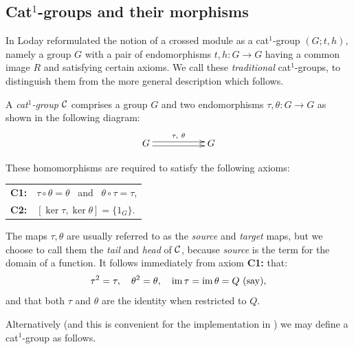 \subsection{Cat$^1$-groups and their morphisms} 
\label{subs:cat1}  

In \cite{loday1} Loday reformulated the notion of  
a crossed module as a cat$^1$-group $(G;t,h)$, 
namely a group $G$ with a pair of endomorphisms $t,h : G \to G$
having a common image $R$ and satisfying certain axioms. 
We call these \emph{traditional} cat$^1$-groups, to distinguish them 
from the more general description which follows. 

\begin{defn} \label{defn:cat1-group1}
A \emph{cat$^1$-group} $\mathcal{C}$ comprises a group $G$ and 
two endomorphisms $\tau,\theta : G \to G$ as shown in the following diagram:
$$
\xymatrix{
 G  \ar[rr] <0.5ex>^{\tau,\ \theta} \ar[rr] <-0.5ex>
   &&  G  \\
}
$$

\noindent
These homomorphisms are required to satisfy the following axioms:
\begin{center}
\begin{tabular}{r l}
\textbf{C1:} & $\tau \circ \theta = \theta$ ~and~ $\theta \circ \tau = \tau$, \\
\textbf{C2:} & $[\ker\tau, \ker\theta] = \{ 1_G \}$.
\end{tabular}
\end{center}
\end{defn} 

The maps  $\tau,\theta$  are usually referred to as the 
  
\emph{source} and \emph{target} maps, but we choose to call them the 
\emph{tail} and \emph{head} of  $\mathcal{C}$, 
because \emph{source} is the {\GAP} term for the domain of a function. 
It follows immediately from axiom {\bf C1:} that: 
$$
\tau^2 = \tau,\quad \theta^2 = \theta,\quad 
\mathrm{im}\,\tau = \mathrm{im}\,\theta = Q ~(\mbox{say}),
$$
and that both $\tau$ and $\theta$ are the identity when restricted to $Q$. 

\medskip
Alternatively (and this is convenient for the implementation in \XMod) 
we may define a cat$^1$-group as follows. 

